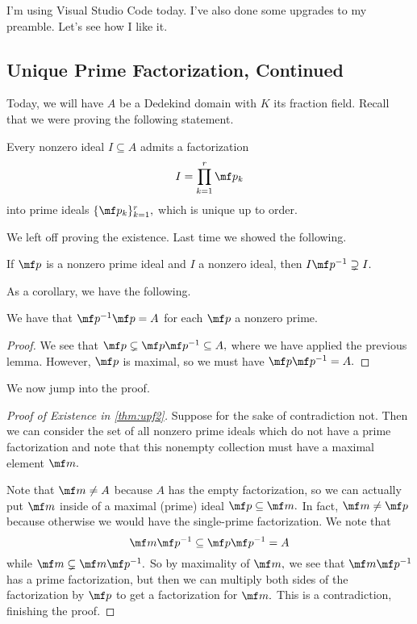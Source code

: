 











I'm using Visual Studio Code today. I've also done some upgrades to my preamble. Let's see how I like it.

\subsection{Unique Prime Factorization, Continued}
Today, we will have $A$ be a Dedekind domain with $K$ its fraction field. Recall that we were proving the following statement.
\begin{thm} \label{thm:upf2}
    Every nonzero ideal $I\subseteq A$ admits a factorization
    \[I=\prod_{k=1}^r\mf p_k\]
    into prime ideals $\{\mf p_k\}_{k=1}^r,$ which is unique up to order.
\end{thm}
We left off proving the existence. Last time we showed the following.
\begin{lem}
    If $\mf p$ is a nonzero prime ideal and $I$ a nonzero ideal, then $I\mf p^{-1}\supsetneq I.$
\end{lem}
As a corollary, we have the following.
\begin{cor}
    We have that $\mf p^{-1}\mf p=A$ for each $\mf p$ a nonzero prime.
\end{cor}
\begin{proof}
    We see that $\mf p\subsetneq\mf p\mf p^{-1}\subseteq A,$ where we have applied the previous lemma. However, $\mf p$ is maximal, so we must have $\mf p\mf p^{-1}=A.$
\end{proof}
We now jump into the proof.
\begin{proof}[Proof of Existence in \autoref{thm:upf2}]
    Suppose for the sake of contradiction not. Then we can consider the set of all nonzero prime ideals which do not have a prime factorization and note that this nonempty collection must have a maximal element $\mf m.$

    Note that $\mf m\ne A$ because $A$ has the empty factorization, so we can actually put $\mf m$ inside of a maximal (prime) ideal $\mf p\subseteq\mf m.$ In fact, $\mf m\ne\mf p$ because otherwise we would have the single-prime factorization. We note that
    \[\mf m\mf p^{-1}\subseteq\mf p\mf p^{-1}=A\]
    while $\mf m\subsetneq \mf m\mf p^{-1}.$ So by maximality of $\mf m,$ we see that $\mf m\mf p^{-1}$ has a prime factorization, but then we can multiply both sides of the factorization by $\mf p$ to get a factorization for $\mf m.$ This is a contradiction, finishing the proof.
\end{proof}
